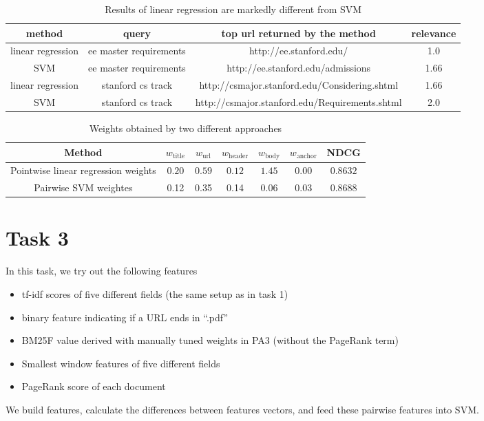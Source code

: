 \begin{table}[h!]
\begin{center}
\begin{tabular}{|c|c|c|c|}
  \hline
 method & query & top url returned by the method & relevance \\  \hline
linear regression & ee master requirements &  http://ee.stanford.edu/  & 1.0 \\\hline
SVM & ee master requirements  & http://ee.stanford.edu/admissions & 1.66 \\\hline
linear regression & stanford cs track &  http://csmajor.stanford.edu/Considering.shtml &
1.66 \\\hline
SVM & stanford cs track &  http://csmajor.stanford.edu/Requirements.shtml & 2.0 \\\hline
\end{tabular}
\caption{Results of linear regression are markedly different from SVM}\label{tab:rel}
\end{center}
\end{table}

\begin{table}[h!]
\begin{center}
\begin{tabular}{|c|c|c|c|c|c|c|}
  \hline
  Method & $w_\textrm{title}$ & $w_\textrm{url}$ & $w_\textrm{header}$ & $w_\textrm{body}$ & $w_\textrm{anchor}$ & NDCG \\
  \hline
  Pointwise linear regression weights & $0.20$ & $0.59$ & $0.12$ & $1.45$ & $0.00$ & $0.8632$ \\
  \hline
  Pairwise SVM weightes & 0.12 & 0.35 &  0.14 &  0.06 &  0.03 &  0.8688 \\
  \hline
\end{tabular}
\caption{Weights obtained by two different approaches}\label{tab:wtt}
\end{center}
\end{table}

\section*{Task 3}
In this task, we try out the following features
\begin{itemize}
  \item[] tf-idf scores of five different fields (the same setup as in task 1)
  \item[] binary feature indicating if a URL ends in ``.pdf''
  \item[] BM25F value derived with manually tuned weights in PA3 (without the PageRank term)
  \item[] Smallest window features of five different fields
  \item[] PageRank score of each document
\end{itemize}
We build features, calculate the differences between features vectors, and feed these pairwise features into SVM.

